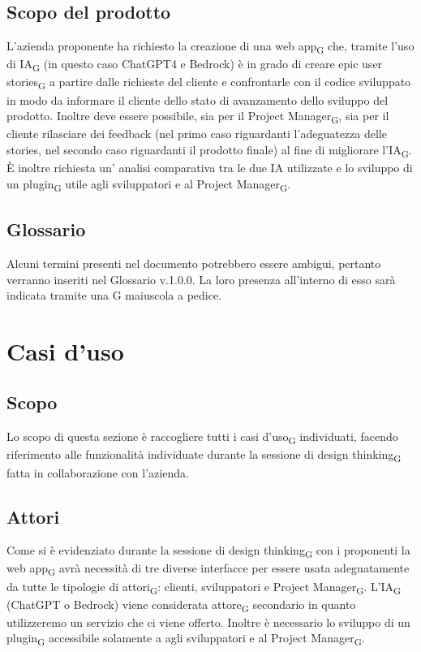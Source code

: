 \documentclass{article}
\begin{document}
\subsection*{Scopo del prodotto}
L'azienda proponente ha richiesto la creazione di una web app\textsubscript{G} che, tramite l'uso di IA\textsubscript{G} (in questo caso ChatGPT4 e Bedrock) è in grado di creare epic user stories\textsubscript{G} a partire dalle richieste del cliente e confrontarle con il codice sviluppato in modo da informare il cliente dello stato di avanzamento dello sviluppo del prodotto. Inoltre deve essere possibile, sia per il Project Manager\textsubscript{G}, sia per il cliente rilasciare dei feedback (nel primo caso riguardanti l'adeguatezza delle stories, nel secondo caso riguardanti il prodotto finale) al fine di migliorare l'IA\textsubscript{G}. È inoltre richiesta un' analisi comparativa tra le due IA utilizzate e lo sviluppo di un plugin\textsubscript{G} utile agli sviluppatori e al Project Manager\textsubscript{G}.

\subsection*{Glossario}
Alcuni termini presenti nel documento potrebbero essere ambigui, pertanto verranno inseriti nel Glossario v.1.0.0. La loro presenza all'interno di esso sarà indicata tramite una G maiuscola a pedice.

\section*{Casi d'uso}
\subsection*{Scopo}
Lo scopo di questa sezione è raccogliere tutti i casi d'uso\textsubscript{G} individuati, facendo riferimento alle funzionalità individuate durante la sessione di design thinking\textsubscript{G} fatta in collaborazione con l'azienda.

\subsection*{Attori}
Come si è evidenziato durante la sessione di design thinking\textsubscript{G} con i proponenti la web app\textsubscript{G} avrà necessità di tre diverse interfacce per essere usata adeguatamente da tutte le tipologie di attori\textsubscript{G}: clienti, sviluppatori e Project Manager\textsubscript{G}. L'IA\textsubscript{G}  (ChatGPT o Bedrock) viene considerata attore\textsubscript{G} secondario in quanto utilizzeremo un servizio che ci viene offerto. Inoltre è necessario lo sviluppo di un plugin\textsubscript{G} accessibile solamente a agli sviluppatori e al Project Manager\textsubscript{G}.\\\\
\end{document}
